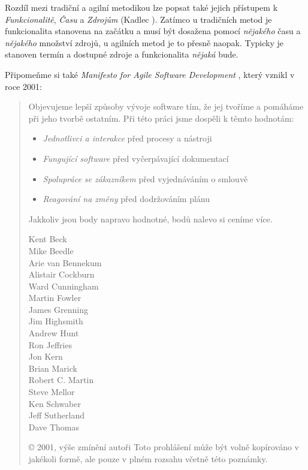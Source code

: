 Rozdíl mezi tradiční a agilní metodikou lze popsat také jejich přístupem k \emph{Funkcionalitě}, \emph{Času} a \emph{Zdrojům} (Kadlec \cite{kadlec}). Zatímco u tradičních metod je funkcionalita stanovena na začátku a musí být dosažena pomocí \emph{nějakého} času a \emph{nějakého} množství zdrojů, u agilních metod je to přesně naopak. Typicky je stanoven termín a dostupné zdroje a funkcionalita \emph{nějaká} bude.

Připomeňme si také \emph{Manifesto for Agile Software Development} \cite{manifesto}, který vznikl v roce 2001:

\begin{quote}
Objevujeme lepší způsoby vývoje software tím,
že jej tvoříme a pomáháme při jeho tvorbě ostatním.
Při této práci jsme dospěli k těmto hodnotám:
\begin{itemize}
	\item \emph{Jednotlivci a interakce} před procesy a nástroji
	\item \emph{Fungující software} před vyčerpávající dokumentací
	\item \emph{Spolupráce se zákazníkem} před vyjednáváním o smlouvě
	\item \emph{Reagování na změny} před dodržováním plánu
\end{itemize}
Jakkoliv jsou body napravo hodnotné,
bodů nalevo si ceníme více.

\begin{multicols}{3}
Kent Beck\\
Mike Beedle\\
Arie van Bennekum\\
Alistair Cockburn\\
Ward Cunningham\\
Martin Fowler\\
James Grenning\\
Jim Highsmith\\
Andrew Hunt\\
Ron Jeffries\\
Jon Kern\\
Brian Marick\\
Robert C. Martin\\
Steve Mellor\\
Ken Schwaber\\
Jeff Sutherland\\
Dave Thomas\\
\end{multicols}

{\color{gray}
© 2001, výše zmínění autoři
Toto prohlášení může být volně kopírováno v jakékoli formě,
ale pouze v plném rozsahu včetně této poznámky.
}

\end{quote}

